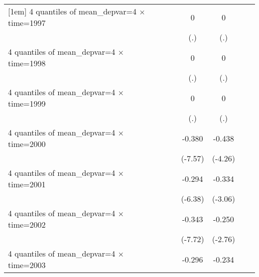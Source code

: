 \begin{table}[htbp]
\begin{tabular}{l*{6}{c}}
[1em]
4 quantiles of mean\_depvar=4 $\times$ time=1997&                     &                     &           0         &           0         &                     &                     \\
                    &                     &                     &         (.)         &         (.)         &                     &                     \\
[1em]
4 quantiles of mean\_depvar=4 $\times$ time=1998&                     &                     &           0         &           0         &                     &                     \\
                    &                     &                     &         (.)         &         (.)         &                     &                     \\
[1em]
4 quantiles of mean\_depvar=4 $\times$ time=1999&                     &                     &           0         &           0         &                     &                     \\
                    &                     &                     &         (.)         &         (.)         &                     &                     \\
[1em]
4 quantiles of mean\_depvar=4 $\times$ time=2000&                     &                     &      -0.380\sym{***}&      -0.438\sym{***}&                     &                     \\
                    &                     &                     &     (-7.57)         &     (-4.26)         &                     &                     \\
[1em]
4 quantiles of mean\_depvar=4 $\times$ time=2001&                     &                     &      -0.294\sym{***}&      -0.334\sym{***}&                     &                     \\
                    &                     &                     &     (-6.38)         &     (-3.06)         &                     &                     \\
[1em]
4 quantiles of mean\_depvar=4 $\times$ time=2002&                     &                     &      -0.343\sym{***}&      -0.250\sym{**} &                     &                     \\
                    &                     &                     &     (-7.72)         &     (-2.76)         &                     &                     \\
[1em]
4 quantiles of mean\_depvar=4 $\times$ time=2003&                     &                     &      -0.296\sym{***}&      -0.234\sym{***}&                     &                     \\

\end{tabular}
\end{table}
